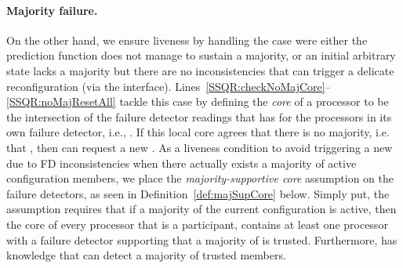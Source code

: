 \documentclass[11pt]{article}
\begin{document}
\paragraph{Majority failure.}
On the other hand, we ensure liveness by handling the case were either the prediction function does not manage to sustain a majority, or an initial arbitrary state lacks a majority but there are no  inconsistencies that can trigger a delicate reconfiguration (via the  interface).
Lines~\ref{SSQR:checkNoMajCore}--\ref{SSQR:noMajResetAll} tackle this case by defining the \emph{core} of a processor  to be the intersection of the failure detector readings that  has for the processors in its own failure detector, i.e., .
If this local core agrees that there is no majority, i.e. that , then  can request a new .
As a liveness condition to avoid triggering a new  due to FD inconsistencies when there actually exists a majority of active configuration members, we place the \emph{majority-supportive core} assumption on the failure detectors, as seen in Definition~\ref{def:majSupCore} below.
Simply put, the assumption requires that if a majority of the current configuration is active, then the core of every processor  that is a participant, contains at least one processor  with a failure detector supporting that a majority of  is trusted.
Furthermore,  has knowledge that  can detect a majority of trusted members.
\end{document}
